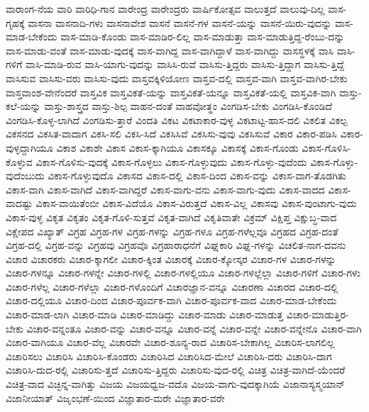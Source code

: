 {ವಾರಾಂಗ-ನೆಯ
ವಾರಿ
ವಾರಿಧಿ-ಗಾನ
ವಾರೇಂದ್ರ
ವಾರೇಂದ್ರರು
ವಾರ್ಷಿಕೋತ್ಸವ
ವಾಲುತ್ತದೆ
ವಾಲುವು-ದಿಲ್ಲ
ವಾಸ-ಗೃಹಕ್ಕೆ
ವಾಸನಾ
ವಾಸನಾದಿ-ಗಳು
ವಾಸನಾವೇಶ
ವಾಸನೆ
ವಾಸನೆ-ಗಳ
ವಾಸನೆ-ಯನ್ನು
ವಾಸನೆ-ಯಿರು-ವುದನ್ನು
ವಾಸ-ಮಾಡ-ಬೇಕೆಂದು
ವಾಸ-ಮಾಡಿ-ಕೊಂಡು
ವಾಸ-ಮಾಡಿರ-ಲಿಲ್ಲ
ವಾಸ-ಮಾಡುತ್ತಾ
ವಾಸ-ಮಾಡುತ್ತಿದ್ದ-ರೆಂಬು-ದನ್ನು
ವಾಸ-ಮಾಡು-ವಂತೆ
ವಾಸ-ಮಾಡು-ವುದಕ್ಕೆ
ವಾಸ-ವಾಗಿದ್ದ
ವಾಸ-ವಾಗಿದ್ದಾಳೆ
ವಾಸ-ವಾಗಿದ್ದು
ವಾಸಸ್ಥಳಕ್ಕೆ
ವಾಸಿ
ವಾಸಿ-ಗಳಿಗೆ
ವಾಸಿ-ಮಾಡಿ-ರುವ
ವಾಸಿ-ಯಾಗು-ವುದನ್ನು
ವಾಸಿಸಿ-ರುವೆ
ವಾಸಿಸು-ತ್ತಿದ್ದರು
ವಾಸಿಸು-ತ್ತಿದ್ದಾಗ
ವಾಸಿಸು-ತ್ತಿದ್ದೆ
ವಾಸಿಸುವ
ವಾಸಿಸು-ವರು
ವಾಸಿಸು-ವುದು
ವಾಸ್ತವಕ್ಕಿಳಿಯೋಣ
ವಾಸ್ತವ-ದಲ್ಲಿ
ವಾಸ್ತವ-ವಾಗಿ
ವಾಸ್ತವ-ವಾಗಿರ-ಬೇಕು
ವಾಸ್ತವಾಂಶ-ವೇನೆಂದರೆ
ವಾಸ್ತವಿಕ
ವಾಸ್ತವಿಕತೆ-ಯನ್ನು
ವಾಸ್ತವಿಕತೆ-ಯನ್ನೂ
ವಾಸ್ತವಿಕತೆ-ಯಲ್ಲಿ
ವಾಸ್ತವಿಕ-ವಾಗಿ
ವಾಸ್ತು-ಕಲೆ-ಯನ್ನು
ವಾಸ್ತು-ಶಾಸ್ತ್ರದ
ವಾಸ್ತು-ಶಿಲ್ಪ
ವಾಹನ-ದಂತೆ
ವಾಹವೋತ್ಥಂ
ವಿಂಗಡಿಸ-ಬೇಕು
ವಿಂಗಡಿಸಿ-ಕೊಂಡಿದೆ
ವಿಂಗಡಿಸಿ-ಕೊಳ್ಳ-ಲಾಗಿದೆ
ವಿಂಗಡಿಸು-ತ್ತಾರೆ
ವಿಂದತಿ
ವಿಕಟ
ವಿಕಟಾಕಾರ-ವುಳ್ಳ
ವಿಕಟಾಟ್ಟ-ಹಾಸ-ದಲಿ
ವಿಕಲಿತ
ವಿಕಲ್ಪ
ವಿಕಸನದ
ವಿಕಸಿತ-ವಾದಾಗ
ವಿಕಸಿ-ಸಲಿ
ವಿಕಸಿ-ಸಿದೆ
ವಿಕಸಿಸಿವೆ
ವಿಕಸಿಸು-ವುವು
ವಿಕಸಿಸುವೆ
ವಿಕಾರ
ವಿಕಾರ-ಪಡಿಸಿ
ವಿಕಾರ-ವುಳ್ಳದ್ದಾಗಿಯೂ
ವಿಕಾಶ
ವಿಕಾಶೇ
ವಿಕಾಸ
ವಿಕಾಸ-ಕ್ಕಾಗಿಯೂ
ವಿಕಾಸಕ್ಕೂ
ವಿಕಾಸಕ್ಕೆ
ವಿಕಾಸ-ಗೊಂಡು
ವಿಕಾಸ-ಗೊಳಿಸಿ-ಕೊಳ್ಳುವ
ವಿಕಾಸ-ಗೊಳಿಸು-ವುದಕ್ಕೆ
ವಿಕಾಸ-ಗೊಳ್ಳಲು
ವಿಕಾಸ-ಗೊಳ್ಳುವುದು
ವಿಕಾಸ-ಗೊಳ್ಳು-ವುದೆಂದು
ವಿಕಾಸ-ಗೊಳ್ಳು-ವುದೆಂಬುದು
ವಿಕಾಸ-ಗೊಳ್ಳುವುದೊ
ವಿಕಾಸದ
ವಿಕಾಸ-ದಲ್ಲಿ
ವಿಕಾಸ-ದಿಂದ
ವಿಕಾಸ-ವನ್ನು
ವಿಕಾಸ-ವಾಗ-ತೊಡಗಿತು
ವಿಕಾಸ-ವಾಗಿ
ವಿಕಾಸ-ವಾಗಿದೆ
ವಿಕಾಸ-ವಾಗಿದ್ದರೆ
ವಿಕಾಸ-ವಾಗು-ವನು
ವಿಕಾಸ-ವಾಗು-ವುದು
ವಿಕಾಸ-ವಾದದ
ವಿಕಾಸ-ವಾದಷ್ಟು
ವಿಕಾಸ-ವಾಯಿತೆಂಬೀ
ವಿಕಾಸ-ವಿದೆಯೊ
ವಿಕಾಸ-ವಿರುತ್ತದೆ
ವಿಕಾಸ-ವಿಲ್ಲ
ವಿಕಾಸವು
ವಿಕಾಸ-ವುಂಟಾಗು-ವುದು
ವಿಕಾಸ-ವುಳ್ಳ
ವಿಕೃತ
ವಿಕೃತಂ
ವಿಕೃತ-ಗೊಳಿ-ಸುತ್ತವೆ
ವಿಕೃತ-ವಾಗಿದೆ
ವಿಕೃತಿವಾತೇ
ವಿಕ್ರಮ್
ವಿಕ್ಷಿಪ್ತ
ವಿಕ್ಷುಬ್ಧ-ವಾದ
ವಿಕ್ಷೇಪದ
ವಿಖ್ಯಾತ್
ವಿಗ್ರಹ
ವಿಗ್ರಹ-ಗಳ
ವಿಗ್ರಹ-ಗಳನ್ನು
ವಿಗ್ರಹ-ಗಳೂ
ವಿಗ್ರಹ-ಗಳೆಲ್ಲವೂ
ವಿಗ್ರಹದ
ವಿಗ್ರಹ-ದಂತೆ
ವಿಗ್ರಹ-ದಲ್ಲಿ
ವಿಗ್ರಹ-ವನ್ನು
ವಿಗ್ರಹವು
ವಿಗ್ರಹವೊ
ವಿಗ್ರಹಾರಾಧನೆಗೆ
ವಿಘ್ನಕಾರಿ
ವಿಘ್ನ-ಗಳನ್ನು
ವಿಚಲಿತ-ನಾಗ-ದವನು
ವಿಚಾರ
ವಿಚಾರಕರು
ವಿಚಾರ-ಕ್ಕಾಗಲೀ
ವಿಚಾರ-ಕ್ಕಿಂತ
ವಿಚಾರಕ್ಕೆ
ವಿಚಾರ-ಕ್ಕೋಸ್ಕರ
ವಿಚಾರ-ಗಳ
ವಿಚಾರ-ಗಳನ್ನು
ವಿಚಾರ-ಗಳನ್ನೂ
ವಿಚಾರ-ಗಳನ್ನೇ
ವಿಚಾರ-ಗಳಲ್ಲಿ
ವಿಚಾರ-ಗಳಲ್ಲಿಯೂ
ವಿಚಾರ-ಗಳಲ್ಲೆಲ್ಲಾ
ವಿಚಾರ-ಗಳಿಗೆ
ವಿಚಾರ-ಗಳು
ವಿಚಾರ-ಗಳೆಲ್ಲ
ವಿಚಾರ-ಗಳೆಲ್ಲಾ
ವಿಚಾರ-ಗಳೊಂದಿಗೆ
ವಿಚಾರಜ್ಞಾನ-ವನ್ನೂ
ವಿಚಾರಣಾ
ವಿಚಾರದ
ವಿಚಾರ-ದಲ್ಲಿ
ವಿಚಾರ-ದಲ್ಲಿಯೂ
ವಿಚಾರ-ದಿಂದ
ವಿಚಾರ-ಪೂರ್ವಕ-ವಾಗಿ
ವಿಚಾರ-ಪೂರ್ವಕ-ವಾದ
ವಿಚಾರ-ಮಾಡ-ಬೇಕೆಂದು
ವಿಚಾರ-ಮಾಡ-ಲಾಗಿ
ವಿಚಾರ-ಮಾಡಿ
ವಿಚಾರ-ಮಾಡಿದ್ದು
ವಿಚಾರ-ಮಾಡು
ವಿಚಾರ-ಮಾಡುತ್ತ
ವಿಚಾರ-ಮಾಡುತ್ತಿರ-ಬೇಕು
ವಿಚಾರ-ವನ್ನಂತೂ
ವಿಚಾರ-ವನ್ನು
ವಿಚಾರ-ವನ್ನೂ
ವಿಚಾರ-ವನ್ನೆ
ವಿಚಾರ-ವನ್ನೇ
ವಿಚಾರ-ವನ್ನೇನೊ
ವಿಚಾರ-ವಾಗಿ
ವಿಚಾರ-ವಾಗಿಯೂ
ವಿಚಾರ-ವೆಲ್ಲ
ವಿಚಾರವೇ
ವಿಚಾರ-ಶೂನ್ಯ-ರಾದ
ವಿಚಾರಿಸ-ಬೇಕಾಗಿಲ್ಲ
ವಿಚಾರಿಸ-ಲಾಗಲಿಲ್ಲ
ವಿಚಾರಿಸಲು
ವಿಚಾರಿಸಿ
ವಿಚಾರಿಸಿ-ಕೊಂಡರು
ವಿಚಾರಿಸಿದ
ವಿಚಾರಿಸಿದ-ಮೇಲೆ
ವಿಚಾರಿಸಿ-ದರು
ವಿಚಾರಿಸಿ-ದಾಗ
ವಿಚಾರಿಸಿ-ದುದ-ರಲ್ಲಿ
ವಿಚಾರಿಸು-ತ್ತದೆ
ವಿಚಾರಿಸು-ತ್ತಿದ್ದರು
ವಿಚಾರಿಸು-ವುದ-ರಲ್ಲಿ
ವಿಚಿತ್ರ
ವಿಚಿತ್ರ-ವಾಗಿದೆ-ಯೆಂದರೆ
ವಿಚಿತ್ರ-ವಾದ
ವಿಚ್ಛಿನ್ನ-ವಾಗಿತ್ತು
ವಿಜಯ
ವಿಜಯಧ್ವಜ-ವದೊ
ವಿಜಯ-ವಾಗು-ವುದಕ್ಕಾಗಿಯೆ
ವಿಜಾನಾಸ್ಯಸ್ಮಯಾನ್
ವಿಜಾನೀಯಾತ್
ವಿಜೃಂಭಣೆ-ಯಿಂದ
ವಿಜ್ಞಾತಾರ-ಮರೇ
ವಿಜ್ಞಾತಾರ-ವರೇ
}
